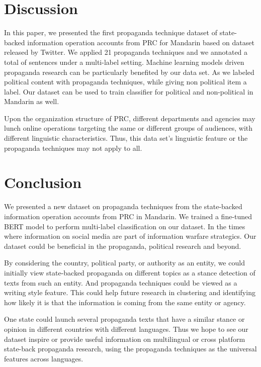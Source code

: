 \documentclass[sigconf]{acmart}
\begin{document}
\section{Discussion}
In this paper, we presented the first propaganda technique dataset of state-backed information operation accounts from PRC for Mandarin based on dataset released by Twitter. We applied 21 propaganda techniques and we annotated a total of  sentences under a multi-label setting. Machine learning models driven propaganda research can be particularly benefited by our data set. As we labeled political content with propaganda techniques, while giving non political item a label. Our dataset can be used to train classifier for political and non-political in Mandarin as well.

Upon the organization structure of PRC, different departments and agencies may lunch online operations targeting the same or different groups of audiences, with different linguistic characteristics. Thus, this data set's linguistic feature or the propaganda techniques may not apply to all. 

\section{Conclusion}

We presented a new dataset on propaganda techniques from the state-backed information operation accounts from PRC in Mandarin. We trained a fine-tuned BERT model to perform multi-label classification on our dataset. In the times where information on social media are part of information warfare strategics. Our dataset could be beneficial in the propaganda, political research and beyond.

By considering the country, political party, or authority as an entity, we could initially view state-backed propaganda on different topics as a stance detection of texts from such an entity. And propaganda techniques could be viewed as a writing style feature. This could help future research in clustering and identifying how likely it is that the information is coming from the same entity or agency.

One state could launch several propaganda texts that have a similar stance or opinion in different countries with different languages. Thus we hope to see our dataset inspire or provide useful information on multilingual or cross platform state-back propaganda research, using the propaganda techniques as the universal features across languages. 




\pagebreak
\end{document}

